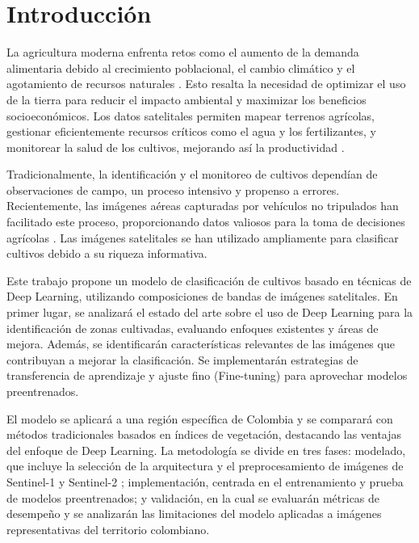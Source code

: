 \section{Introducción}

La agricultura moderna enfrenta retos como el aumento de la demanda alimentaria debido al crecimiento poblacional, el cambio climático y el agotamiento de recursos naturales \cite{thayer2020}. Esto resalta la necesidad de optimizar el uso de la tierra para reducir el impacto ambiental y maximizar los beneficios socioeconómicos. Los datos satelitales permiten mapear terrenos agrícolas, gestionar eficientemente recursos críticos como el agua y los fertilizantes, y monitorear la salud de los cultivos, mejorando así la productividad \cite{boryan2011}.

Tradicionalmente, la identificación y el monitoreo de cultivos dependían de observaciones de campo, un proceso intensivo y propenso a errores. Recientemente, las imágenes aéreas capturadas por vehículos no tripulados han facilitado este proceso, proporcionando datos valiosos para la toma de decisiones agrícolas \cite{hu2021}. Las imágenes satelitales se han utilizado ampliamente para clasificar cultivos debido a su riqueza informativa.

Este trabajo propone un modelo de clasificación de cultivos basado en técnicas de Deep Learning, utilizando composiciones de bandas de imágenes satelitales. En primer lugar, se analizará el estado del arte sobre el uso de Deep Learning para la identificación de zonas cultivadas, evaluando enfoques existentes y áreas de mejora. Además, se identificarán características relevantes de las imágenes que contribuyan a mejorar la clasificación. Se implementarán estrategias de transferencia de aprendizaje y ajuste fino (Fine-tuning) para aprovechar modelos preentrenados.

El modelo se aplicará a una región específica de Colombia y se comparará con métodos tradicionales basados en índices de vegetación, destacando las ventajas del enfoque de Deep Learning. La metodología se divide en tres fases: modelado, que incluye la selección de la arquitectura y el preprocesamiento de imágenes de Sentinel-1 y Sentinel-2 \cite{descals2021}; implementación, centrada en el entrenamiento y prueba de modelos preentrenados; y validación, en la cual se evaluarán métricas de desempeño y se analizarán las limitaciones del modelo aplicadas a imágenes representativas del territorio colombiano.
